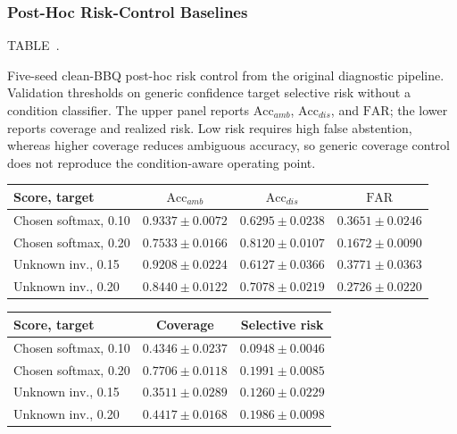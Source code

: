 \documentclass{ieeeaccess}
\newcommand{\accamb}{\mathrm{Acc}_{amb}}
\newcommand{\accdis}{\mathrm{Acc}_{dis}}
\newcommand{\far}{\mathrm{FAR}}
\newcommand{\inlinetablecaption}[2]{%
  \par\vspace{0.62\baselineskip}\noindent
  \refstepcounter{table}\label{#1}%
  {\color{accessblue}\tablecapheadfont TABLE~\thetable.\ }%
  {\tablecapfont #2\par}%
  \vspace{6pt}%
}
\begin{document}
\subsubsection{Post-Hoc Risk-Control Baselines}
\label{app:risk_control}
\noindent\begin{minipage}{\columnwidth}
\inlinetablecaption{tab:risk_control_baselines}{Five-seed clean-BBQ post-hoc risk control from the original diagnostic pipeline. Validation thresholds on generic confidence target selective risk without a condition classifier. The upper panel reports $\accamb$, $\accdis$, and $\far$; the lower reports coverage and realized risk. Low risk requires high false abstention, whereas higher coverage reduces ambiguous accuracy, so generic coverage control does not reproduce the condition-aware operating point.}
\begin{center}
\scriptsize
\setlength{\tabcolsep}{2.3pt}
\renewcommand{\arraystretch}{1.08}
\begin{tabular}{@{}lccc@{}}
\toprule
Score, target & $\accamb$ & $\accdis$ & $\far$ \\
\midrule
Chosen softmax, 0.10 & $0.9337\pm0.0072$ & $0.6295\pm0.0238$ & $0.3651\pm0.0246$ \\
Chosen softmax, 0.20 & $0.7533\pm0.0166$ & $0.8120\pm0.0107$ & $0.1672\pm0.0090$ \\
Unknown inv., 0.15 & $0.9208\pm0.0224$ & $0.6127\pm0.0366$ & $0.3771\pm0.0363$ \\
Unknown inv., 0.20 & $0.8440\pm0.0122$ & $0.7078\pm0.0219$ & $0.2726\pm0.0220$ \\
\bottomrule
\end{tabular}
\par\vspace{4pt}
\begin{tabular}{@{}lcc@{}}
\toprule
Score, target & Coverage & Selective risk \\
\midrule
Chosen softmax, 0.10 & $0.4346\pm0.0237$ & $0.0948\pm0.0046$ \\
Chosen softmax, 0.20 & $0.7706\pm0.0118$ & $0.1991\pm0.0085$ \\
Unknown inv., 0.15 & $0.3511\pm0.0289$ & $0.1260\pm0.0229$ \\
Unknown inv., 0.20 & $0.4417\pm0.0168$ & $0.1986\pm0.0098$ \\
\bottomrule
\end{tabular}
\end{center}
\end{minipage}
\par\vspace{0.5\baselineskip}
\end{document}
